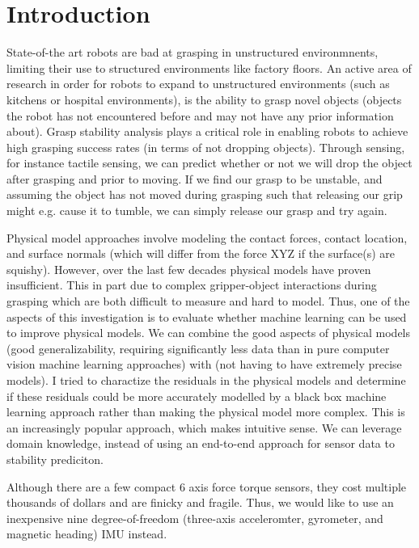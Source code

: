 \documentclass[preprint,12pt,3p]{elsarticle}
\begin{document}



\section{Introduction}
State-of-the art robots are bad at grasping in unstructured environmnents, limiting their use to
structured environments like factory floors. An active area of research in order for robots to expand to unstructured
environments (such as kitchens or hospital environments),  is the ability to grasp
novel objects (objects the robot has not encountered before and may not have any prior information
about). Grasp stability analysis plays a critical role in enabling robots to achieve high grasping
success rates (in terms of not dropping objects). Through sensing, for instance tactile sensing, we
can predict whether or not we will drop the object after grasping and prior to moving. If we find
our grasp to be unstable, and assuming the object has not moved during grasping such that releasing
our grip might e.g. cause it to tumble, we can simply release our grasp and try again. 

Physical model approaches involve modeling the contact forces, contact location, and surface normals
(which will differ from the force XYZ if the surface(s) are squishy).  However, over the last few
decades physical models have proven insufficient. This in part due to complex gripper-object
interactions during grasping which are both difficult to measure and hard to model. Thus, one of the
aspects of this investigation is to evaluate whether machine learning can be used to improve
physical models. We can combine the good aspects of physical models (good generalizability,
requiring significantly less data than in pure computer vision machine learning approaches) with
(not having to have extremely precise models). I tried to charactize the residuals in
the physical models and determine if these residuals could be more accurately modelled by a black
box machine learning approach rather than making the physical model more complex. This is an
increasingly popular approach, which makes intuitive sense. We can leverage
domain knowledge, instead of using an end-to-end approach for sensor data to stability prediciton.

Although there are a few compact 6 axis force torque sensors, they cost multiple thousands of
dollars and are finicky and fragile. Thus, we would like to use an inexpensive nine
degree-of-freedom (three-axis acceleromter, gyrometer, and magnetic heading) IMU instead.
\end{document}
